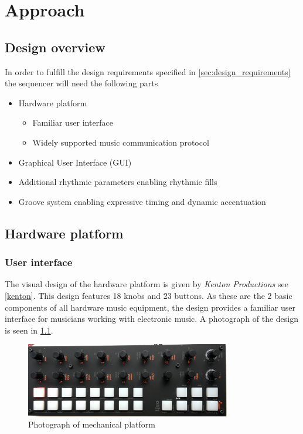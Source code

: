\chapter{Approach}

\section{Design overview}
In order to fulfill the design requirements specified in \cref{sec:design_requirements} the sequencer will need the following parts

\begin{itemize}
\item Hardware platform
    \begin{itemize}
        \item Familiar user interface
        \item Widely supported music communication protocol
    \end{itemize}
\item Graphical User Interface (GUI)
\item Additional rhythmic parameters enabling rhythmic fills
\item Groove system enabling expressive timing and dynamic accentuation
\end{itemize}

\section{Hardware platform}

\subsection{User interface}
\label{sec:UI}

The visual design of the hardware platform is given by \textit{Kenton Productions} see \cref{kenton}. This design features 18 knobs and 23 buttons. As these  are the 2 basic components of all hardware music equipment, the design provides a familiar user interface for musicians working with electronic music. A photograph of the design is seen in \cref{fig:torso}.

\begin{figure}[H]
    \centering
    \includegraphics[width=0.8\textwidth]{graphics/front_scaled.png}
    \caption{Photograph of mechanical platform}
    \label{fig:torso}
\end{figure}

